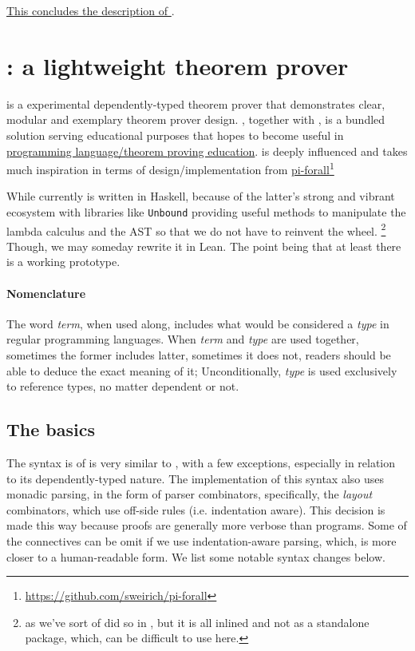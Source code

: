 \documentclass[a4paper, 11pt]{article}
\theoremstyle{remark}\newtheorem*{remark}{Remark}
\theoremstyle{definition}\newtheorem*{definition}{Definition}
\begin{document}
\begin{center}
\underline{This concludes the description of \Tigris}.
\end{center}
\pagebreak

\section{\Tigrisd: a lightweight theorem prover}
\renewottcommands[dd]

\Tigrisd is a experimental dependently-typed theorem prover that demonstrates
clear, modular and exemplary theorem prover design. \Tigrisd, together with \Tigris,
is a bundled solution serving educational purposes that hopes to become useful in
\underline{programming language/theorem proving education}. \Tigrisd is deeply influenced and takes much inspiration in terms
of design/implementation from \href{https://github.com/sweirich/pi-forall}{pi-forall}\footnote{\url{https://github.com/sweirich/pi-forall}}

While currently \Tigrisd is written in Haskell, because of the latter's strong and vibrant
ecosystem with libraries like \texttt{Unbound} providing useful methods to manipulate
the lambda calculus and the AST so that we do not have to reinvent the wheel.
\footnote{as we've sort of did so
in \Tigris, but it is all inlined and not as a standalone package, which, can be difficult to use here.}
Though, we may someday rewrite it in Lean.
The point being that at least there is a working prototype.

\paragraph{Nomenclature} The word \emph{term}, when used along, includes what would
be considered a \emph{type} in regular programming languages. When \emph{term} and
\emph{type} are used together, sometimes the former includes latter, sometimes it does not,
readers should be able to deduce the exact meaning of it;
Unconditionally, \emph{type} is used exclusively to reference types, no matter dependent or not.

\subsection{The basics} The syntax is of \Tigrisd is very similar to \Tigris, with
a few exceptions, especially in relation to its dependently-typed nature. The implementation
of this syntax also uses monadic parsing, in the form of parser combinators, specifically,
the \emph{layout} combinators, which use off-side rules (i.e. indentation aware). This decision
is made this way because proofs are generally more verbose than programs. Some of the
connectives can be omit if we use indentation-aware parsing, which, is more closer
to a human-readable form.
We list some notable syntax changes below.
\end{document}
